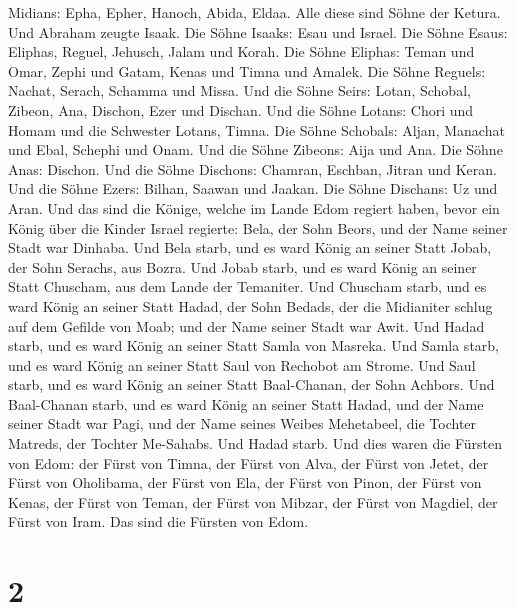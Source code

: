 Midians: Epha, Epher, Hanoch, Abida, Eldaa. Alle diese sind Söhne der
Ketura.  Und Abraham zeugte Isaak. Die Söhne Isaaks: Esau
und Israel.  Die Söhne Esaus: Eliphas, Reguel, Jehusch,
Jalam und Korah.  Die Söhne Eliphas: Teman und Omar,
Zephi und Gatam, Kenas und Timna und Amalek.  Die Söhne
Reguels: Nachat, Serach, Schamma und Missa.  Und die
Söhne Seirs: Lotan, Schobal, Zibeon, Ana, Dischon, Ezer und Dischan.
 Und die Söhne Lotans: Chori und Homam und die Schwester
Lotans, Timna.  Die Söhne Schobals: Aljan, Manachat und
Ebal, Schephi und Onam. Und die Söhne Zibeons:  Aija und
Ana. Die Söhne Anas: Dischon. Und die Söhne Dischons: Chamran, Eschban,
Jitran und Keran.  Und die Söhne Ezers: Bilhan, Saawan
und Jaakan. Die Söhne Dischans: Uz und Aran.  Und das
sind die Könige, welche im Lande Edom regiert haben, bevor ein König
über die Kinder Israel regierte: Bela, der Sohn Beors, und der Name
seiner Stadt war Dinhaba.  Und Bela starb, und es ward
König an seiner Statt Jobab, der Sohn Serachs, aus Bozra.
 Und Jobab starb, und es ward König an seiner Statt
Chuscham, aus dem Lande der Temaniter.  Und Chuscham
starb, und es ward König an seiner Statt Hadad, der Sohn Bedads, der die
Midianiter schlug auf dem Gefilde von Moab; und der Name seiner Stadt
war Awit.  Und Hadad starb, und es ward König an seiner
Statt Samla von Masreka.  Und Samla starb, und es ward
König an seiner Statt Saul von Rechobot am Strome.  Und
Saul starb, und es ward König an seiner Statt Baal-Chanan, der Sohn
Achbors.  Und Baal-Chanan starb, und es ward König an
seiner Statt Hadad, und der Name seiner Stadt war Pagi, und der Name
seines Weibes Mehetabeel, die Tochter Matreds, der Tochter Me-Sahabs.
Und Hadad starb.  Und dies waren die Fürsten von Edom:
der Fürst von Timna, der Fürst von Alva,  der Fürst von
Jetet, der Fürst von Oholibama, der Fürst von Ela, der Fürst von Pinon,
 der Fürst von Kenas, der Fürst von Teman,
 der Fürst von Mibzar, der Fürst von Magdiel, der Fürst
von Iram. Das sind die Fürsten von Edom.

\hypertarget{section-1}{%
\section{2}\label{section-1}}

